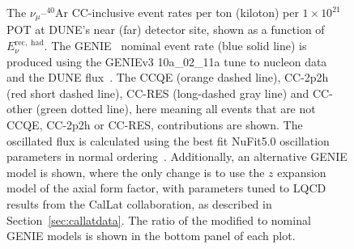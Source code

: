 \documentclass{ar-1col}
\begin{document}
\begin{figure}[htbp]
  \centering
  \hspace{75pt}
  \vspace{11pt}
  \caption{The $\nu_{\mu}$--$^{40}$Ar CC-inclusive event rates per ton (kiloton) per $1\times10^{21}$POT at DUNE's near (far) detector site, shown as a function of $E^{\mathrm{rec,\;had}}_{\nu}$. The GENIE~\cite{Andreopoulos:2009rq, GENIE:2021npt} nominal event rate (blue solid line) is produced using the GENIEv3 10a\_02\_11a tune to nucleon data~\cite{GENIE:2021zuu} and the DUNE flux~\cite{Abi:2020evt}. The CCQE (orange dashed line), CC-2p2h (red short dashed line), CC-RES (long-dashed gray line) and CC-other (green dotted line), here meaning all events that are not CCQE, CC-2p2h or CC-RES, contributions are shown. The oscillated flux is calculated using the best fit NuFit5.0 oscillation parameters in normal ordering~\cite{Esteban:2020cvm, nufitweb}. Additionally, an alternative GENIE model is shown, where the only change is to use the $z$ expansion model of the axial form factor, with parameters tuned to LQCD results from the CalLat collaboration, as described in Section~\ref{sec:callatdata}.
The ratio of the modified to nominal GENIE models is shown in the bottom panel of each plot.}
  \label{fig:dune_impact}
\end{figure}
\end{document}
